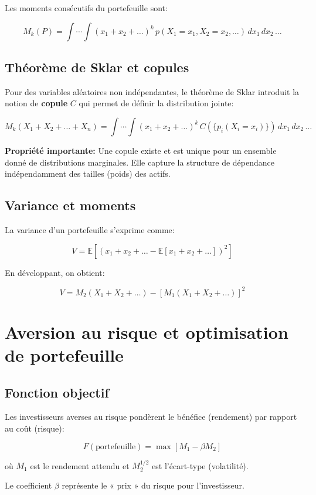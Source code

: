 \documentclass[11pt,a4paper]{article}
\begin{document}
Les moments consécutifs du portefeuille sont:

\[
M_k(P) = \int \cdots \int (x_1 + x_2 + \ldots)^k \, p(X_1 = x_1, X_2 = x_2, \ldots) \, dx_1 \, dx_2 \, \ldots
\]

\subsection{Théorème de Sklar et copules}

Pour des variables aléatoires non indépendantes, le théorème de Sklar introduit la notion de \textbf{copule} $C$ qui permet de définir la distribution jointe:

\[
M_k(X_1 + X_2 + \ldots + X_n) = \int \cdots \int (x_1 + x_2 + \ldots)^k \, C(\{p_i(X_i = x_i)\}) \, dx_1 \, dx_2 \, \ldots
\]

\textbf{Propriété importante:} Une copule existe et est unique pour un ensemble donné de distributions marginales. Elle capture la structure de dépendance indépendamment des tailles (poids) des actifs.

\subsection{Variance et moments}

La variance d'un portefeuille s'exprime comme:

\[
V = \mathbb{E}\left[(x_1 + x_2 + \ldots - \mathbb{E}[x_1 + x_2 + \ldots])^2\right]
\]

En développant, on obtient:

\[
V = M_2(X_1 + X_2 + \ldots) - [M_1(X_1 + X_2 + \ldots)]^2
\]

\section{Aversion au risque et optimisation de portefeuille}

\subsection{Fonction objectif}

Les investisseurs averses au risque pondèrent le bénéfice (rendement) par rapport au coût (risque):

\[
F(\text{portefeuille}) = \max[M_1 - \beta M_2]
\]

où $M_1$ est le rendement attendu et $M_2^{1/2}$ est l'écart-type (volatilité).

Le coefficient $\beta$ représente le « prix » du risque pour l'investisseur.
\end{document}
